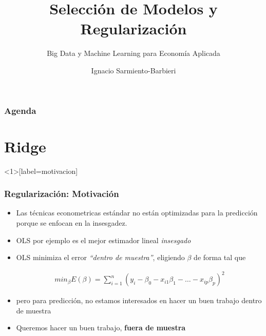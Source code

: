 \documentclass[
  shownotes,
  xcolor={svgnames},
  hyperref={colorlinks,citecolor=DarkBlue,linkcolor=andesred,urlcolor=DarkBlue}
  , aspectratio=169]{beamer}
\begin{document}
\title{Selección de Modelos y Regularización}
\subtitle{Big Data y Machine Learning para Economía Aplicada}
\date{}

\author[Sarmiento-Barbieri]{Ignacio Sarmiento-Barbieri}



\begin{frame}[noframenumbering]
\maketitle
\end{frame}
\begin{frame}
\frametitle{Agenda}

\tableofcontents


\end{frame}
\section{Ridge}
\begin{frame}<1>[label=motivacion]
\frametitle{Regularización: Motivación}

\begin{itemize}
\item Las técnicas econometricas estándar no están optimizadas para la predicción porque se enfocan en la insesgadez.
\medskip
\item OLS por ejemplo es el mejor estimador lineal {\it insesgado}
\medskip
\item OLS minimiza el error {\it ``dentro de muestra''}, eligiendo $\beta$ de forma tal que 


\begin{align}
min_{\beta} E(\beta) = \sum_{i=1}^n (y_i-\beta_0 - x_{i1}\beta_1 - \dots - x_{ip}\beta_p)^2 
\end{align}

\item pero para predicción, no estamos interesados en hacer un buen trabajo dentro de muestra 
\medskip
\item Queremos hacer un buen trabajo, {\bf fuera de muestra}
\end{itemize}
\end{frame}
\end{document}
